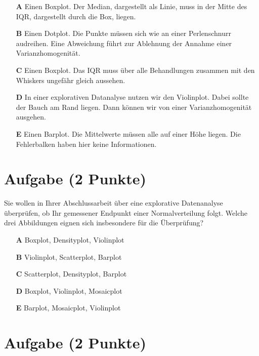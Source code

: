 \documentclass[a4paper, 9pt]{scrartcl}\usepackage[]{graphicx}\usepackage[]{xcolor}
\begin{document}
\begin{enumerate}
\item [\textbf{A} \msquare] Einen Boxplot. Der Median, dargestellt als Linie, muss in der Mitte des IQR, dargestellt durch die Box, liegen.
\item [\textbf{B} \msquare] Einen Dotplot. Die Punkte müssen sich wie an einer Perlenschnurr audreihen. Eine Abweichung führt zur Ablehnung der Annahme einer Varianzhomogenität.
\item [\textbf{C} \msquare] Einen Boxplot. Das IQR muss über alle Behandlungen zusammen mit den Whiskers ungefähr gleich aussehen.
\item [\textbf{D} \msquare] In einer explorativen Datanalyse nutzen wir den Violinplot. Dabei sollte der Bauch am Rand liegen. Dann können wir von einer Varianzhomogenität ausgehen.
\item [\textbf{E} \msquare] Einen Barplot. Die Mittelwerte müssen alle auf einer Höhe liegen. Die Fehlerbalken haben hier keine Informationen.
\end{enumerate}

\section{Aufgabe \hfill (2 Punkte)}




Sie wollen in Ihrer Abschlussarbeit über eine explorative Datenanalyse überprüfen, ob Ihr gemessener Endpunkt einer Normalverteilung folgt. Welche drei Abbildungen eignen sich insbesondere für die Überprüfung?





\begin{enumerate}
\item [\textbf{A} \msquare] Boxplot, Densityplot, Violinplot
\item [\textbf{B} \msquare] Violinplot, Scatterplot, Barplot
\item [\textbf{C} \msquare] Scatterplot, Densityplot, Barplot
\item [\textbf{D} \msquare] Boxplot, Violinplot, Mosaicplot
\item [\textbf{E} \msquare] Barplot, Mosaicplot, Violinplot
\end{enumerate} 

\section{Aufgabe \hfill (2 Punkte)}
\end{document}
